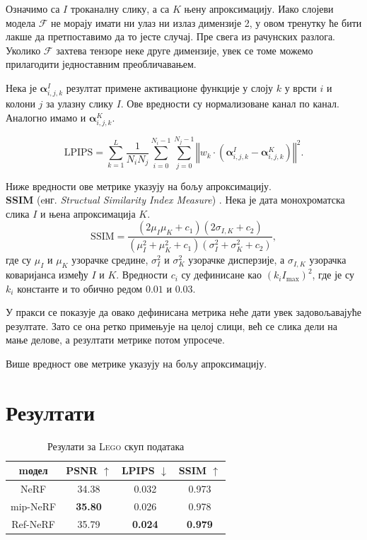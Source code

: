 \documentclass[12pt, a4paper, twoside]{book}
\numberwithin{equation}{chapter}
\numberwithin{theorem}{section}
\numberwithin{definition}{section}
\numberwithin{definitionChapter}{chapter}
\begin{document}
Означимо са $I$ троканалну слику, а са $K$ њену апроксимацију. Иако слојеви  модела $\mathcal{F}$
не морају имати ни улаз ни излаз димензије 2, у овом тренутку ће бити лакше да претпоставимо да то јесте случај. Пре
свега из рачунских разлога. Уколико $\mathcal{F}$ захтева тензоре неке друге димензије, увек се томе можемо прилагодити
једноставним преобличавањем.

Нека је $\boldsymbol{\alpha}_{i, j, k}^{I}$ резултат примене активационе функције у слоју $k$ у врсти
$i$ и колони $j$ за улазну слику $I$. Ове вредности су нормализоване канал по канал. Аналогно имамо и
$\boldsymbol{\alpha}_{i, j, k}^{K}$.

\begin{equation}
	\text{LPIPS} = \sum_{k=1}^{L}\frac{1}{N_i N_j}\sum_{i=0}^{N_i - 1}\sum_{j=0}^{N_j - 1}
	\left\Vert w_k \cdot (\boldsymbol{\alpha}_{i, j, k}^{I} - \boldsymbol{\alpha}_{i, j, k}^{K}) \right\Vert^2.
\end{equation}

Ниже вредности ове метрике указују на бољу апроксимацију. \\

\noindent \textbf{SSIM} (eнг. \textit{Structual Similarity Index Measure}) \cite{ssim}.  Нека је дата монохроматска
слика $I$ и њена апроксимација $K$.
\begin{equation}
	\text{SSIM} = \frac{(2\mu_{I}\mu_{K} + c_1)(2\sigma_{I, K} + c_2)}{(\mu_{I}^2 + \mu_{K}^2 + c_1)(\sigma_{I}^2 + \sigma_{K}^2 + c_2)},
\end{equation}
где су $\mu_{I}$ и $\mu_{K}$ узорачке средине, $\sigma_{I}^2$ и $\sigma_{K}^2$ узорачке дисперзије, а $\sigma_{I, K}$
узорачка коваријанса између $I$ и $K$. Вредности $c_i$ су дефинисане као $(k_i I_{\max})^2$, где је су $k_i$ константе
и то обично редом $0.01$ и $0.03$.

У пракси се показује да овако дефинисана метрика неће дати увек задовољавајуће резултате. Зато се она ретко примењује
на целој слици, већ се слика дели на мање делове, а резултати метрике потом упросече.

Више вредност ове метрике указују на бољу апроксимацију.

\section{Резултати}

	\begin{table}[H]
		\centering
		\begin{tabular}{cccc} \toprule
			{mодел}			& {PSNR $\uparrow$}	& {LPIPS $\downarrow$}	& {SSIM $\uparrow$} \\ \midrule
			{NeRF}			& 34.38				& 0.032					& 0.973 \\ 
			{mip-NeRF}		& \textbf{35.80}	& 0.026					& 0.978 \\
			{Ref-NeRF}		& 35.79				& \textbf{0.024}		& \textbf{0.979} \\ \bottomrule
		\end{tabular}
		\caption{Резулати за \textsc{Lego} скуп података}
		\label{table-lego}
	\end{table}
\end{document}
